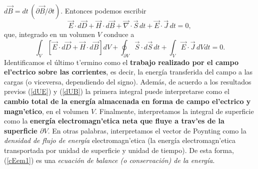 $d\vec{B}=dt\,({\partial \vec{B}}/{\partial t})$. Entonces podemos escribir
\begin{equation}
\vec{E}\cdot
d\vec{D}+\vec{H}\cdot d\vec{B}+\vec\nabla\cdot\vec{S}\,dt+\vec{E}\cdot\vec{J}\,
dt=0,
\end{equation}
que, integrado en un volumen $V$ conduce a 
\begin{equation}
\boxed{\int_V\left[\vec{E}\cdot d\vec{D}+\vec{H}\cdot
d\vec{B}\right]dV+\oint_{\partial V}
\vec{S}\cdot d\vec{S}\,dt+\int_V\vec{E}\cdot\vec{J}\,
dVdt=0.} \label{cEem1}
\end{equation}
Identificamos el último t'ermino como el \textbf{trabajo realizado por el campo el'ectrico sobre las corrientes}, es decir, la energía transferida del campo a las cargas (o viceversa, dependiendo del signo). Además, de acuerdo a los resultados previos (\ref{dUE}) y (\ref{dUB}) la primera integral puede interpretarse como el \textbf{cambio total de la energía almacenada en forma de campo el'ectrico y magn'etico}, en el volumen $V$. Finalmente, interpretamos la integral de superficie como la \textbf{energía electromagn'etica neta que fluye a trav'es de la superficie $\partial V$}. En otras palabras, interpretamos el vector de Poynting como la \textit{densidad de flujo de energía} electromagn'etica (la energía electromagn'etica transportada por unidad de superficie y unidad de tiempo). De esta forma, (\ref{cEem1}) es una \textit{ecuación de balance (o conservación) de la energía}.

